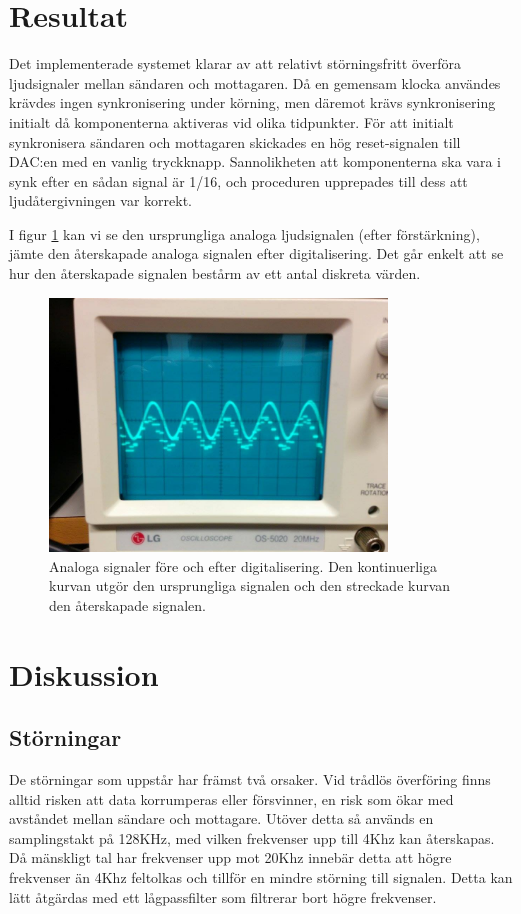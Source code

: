 \documentclass[a4paper,10pt]{article}
\begin{document}
\section{Resultat}

Det implementerade systemet klarar av att relativt störningsfritt överföra ljudsignaler mellan sändaren och mottagaren. Då en gemensam klocka användes krävdes ingen synkronisering under körning, men däremot krävs synkronisering initialt då komponenterna aktiveras vid olika tidpunkter. För att initialt synkronisera sändaren och mottagaren skickades en hög reset-signalen till DAC:en med en vanlig tryckknapp. Sannolikheten att komponenterna ska vara i synk efter en sådan signal är 1/16, och proceduren upprepades till dess att ljudåtergivningen var korrekt. 

I figur \ref{oscilloskop} kan vi se den ursprungliga analoga ljudsignalen (efter förstärkning), jämte den återskapade analoga signalen efter digitalisering. Det går enkelt att se hur den återskapade signalen bestårm av ett antal diskreta värden.


\begin{figure}
\centering
\includegraphics[width=0.8\textwidth]{oscilloskop.jpg}
\caption{Analoga signaler före och efter digitalisering. Den kontinuerliga kurvan utgör den ursprungliga signalen och den streckade kurvan den återskapade signalen.}
\label{oscilloskop}
\end{figure}


\section{Diskussion}
\subsection{Störningar}
De störningar som uppstår har främst två orsaker. Vid trådlös överföring finns alltid risken att data korrumperas eller försvinner, en risk som ökar med avståndet mellan sändare och mottagare. Utöver detta så används en samplingstakt på 128KHz, med vilken frekvenser upp till 4Khz kan återskapas. Då mänskligt tal har frekvenser upp mot 20Khz innebär detta att högre frekvenser än 4Khz feltolkas och tillför en mindre störning till signalen. Detta kan lätt åtgärdas med ett lågpassfilter som filtrerar bort högre frekvenser.
\end{document}
